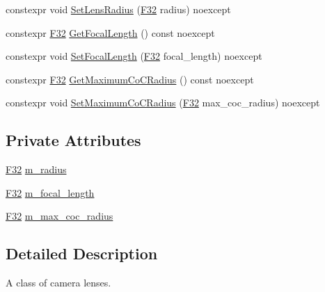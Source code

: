 \begin{DoxyCompactItemize}
\item 
constexpr void \mbox{\hyperlink{classmage_1_1rendering_1_1_camera_lens_ad7d28ba6b6e462711fb645020697f8ed}{Set\+Lens\+Radius}} (\mbox{\hyperlink{namespacemage_aa97e833b45f06d60a0a9c4fc22ae02c0}{F32}} radius) noexcept
\item 
constexpr \mbox{\hyperlink{namespacemage_aa97e833b45f06d60a0a9c4fc22ae02c0}{F32}} \mbox{\hyperlink{classmage_1_1rendering_1_1_camera_lens_a3372be41a251db2a691a84a6413d7ac9}{Get\+Focal\+Length}} () const noexcept
\item 
constexpr void \mbox{\hyperlink{classmage_1_1rendering_1_1_camera_lens_ad954dd19be6f0cc54c74aecf29bb2134}{Set\+Focal\+Length}} (\mbox{\hyperlink{namespacemage_aa97e833b45f06d60a0a9c4fc22ae02c0}{F32}} focal\+\_\+length) noexcept
\item 
constexpr \mbox{\hyperlink{namespacemage_aa97e833b45f06d60a0a9c4fc22ae02c0}{F32}} \mbox{\hyperlink{classmage_1_1rendering_1_1_camera_lens_aea9eeadbb33600a036a57e797776cbc6}{Get\+Maximum\+Co\+C\+Radius}} () const noexcept
\item 
constexpr void \mbox{\hyperlink{classmage_1_1rendering_1_1_camera_lens_a08305f9e891cbdc4152deccbbf287c7f}{Set\+Maximum\+Co\+C\+Radius}} (\mbox{\hyperlink{namespacemage_aa97e833b45f06d60a0a9c4fc22ae02c0}{F32}} max\+\_\+coc\+\_\+radius) noexcept
\end{DoxyCompactItemize}
\subsection*{Private Attributes}
\begin{DoxyCompactItemize}
\item 
\mbox{\hyperlink{namespacemage_aa97e833b45f06d60a0a9c4fc22ae02c0}{F32}} \mbox{\hyperlink{classmage_1_1rendering_1_1_camera_lens_ac93ec7ffd20ce31ad9707f700a99dc12}{m\+\_\+radius}}
\item 
\mbox{\hyperlink{namespacemage_aa97e833b45f06d60a0a9c4fc22ae02c0}{F32}} \mbox{\hyperlink{classmage_1_1rendering_1_1_camera_lens_a3459fd7d208a7ad8f1cf01718e008e36}{m\+\_\+focal\+\_\+length}}
\item 
\mbox{\hyperlink{namespacemage_aa97e833b45f06d60a0a9c4fc22ae02c0}{F32}} \mbox{\hyperlink{classmage_1_1rendering_1_1_camera_lens_a5c7880aabfbe08addb1fcaf9ac5ff940}{m\+\_\+max\+\_\+coc\+\_\+radius}}
\end{DoxyCompactItemize}


\subsection{Detailed Description}
A class of camera lenses. 

